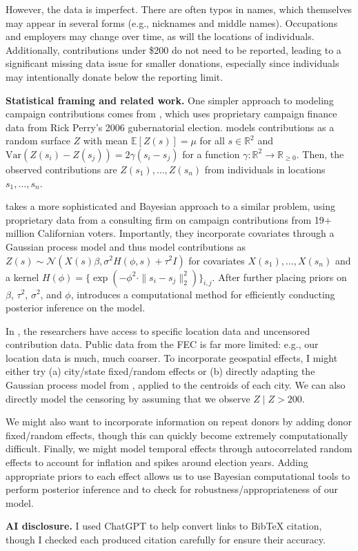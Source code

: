 \documentclass[11pt]{article}
\newcommand{\Nml}{\mathcal{N}}
\newcommand{\E}{\mathbb{E}}
\newcommand{\Var}{\mathrm{Var}}
\newcommand{\R}{\mathbb{R}}
\begin{document}
However, the data is imperfect. There are often typos in names, which themselves may appear in several forms (e.g., nicknames and middle names). Occupations and employers may change over time, as will the locations of individuals. Additionally, contributions under \$200 do not need to be reported, leading to a significant missing data issue for smaller donations, especially since individuals may intentionally donate below the reporting limit.

\textbf{Statistical framing and related work.} One simpler approach to modeling campaign contributions comes from \cite{cg2007_prospecting}, which uses proprietary campaign finance data from Rick Perry's 2006 gubernatorial election. \cite{cg2007_prospecting} models contributions as a random surface $Z$ with mean $\E[Z(s)] = \mu$ for all $s \in \R^2$ and $\Var(Z(s_i) - Z(s_j)) = 2 \gamma(s_i - s_j)$ for a function $\gamma : \R^2 \to \R_{\geq 0}$. Then, the observed contributions are $Z(s_1), \dots, Z(s_n)$ from individuals in locations $s_1, \dots, s_n$. 

\cite{bg2022_appliedgeospatial} takes a more sophisticated and Bayesian approach to a similar problem, using proprietary data from a consulting firm on campaign contributions from 19+ million Californian voters. Importantly, they incorporate covariates through a Gaussian process model and thus model contributions as $Z(s) \sim \Nml(X(s) \beta, \sigma^2 H(\phi, s) + \tau^2 I)$ for covariates $X(s_1), \dots, X(s_n)$ and a kernel $H(\phi) = \{\exp(-\phi^2 \cdot \|s_i - s_j\|_2^2)\}_{i,j}$. After further placing priors on $\beta$, $\tau^2$, $\sigma^2$, and $\phi$, \cite{bg2022_appliedgeospatial} introduces a computational method for efficiently conducting posterior inference on the model.

In \cite{cg2007_prospecting, bg2022_appliedgeospatial}, the researchers have access to specific location data and uncensored contribution data. Public data from the FEC is far more limited: e.g., our location data is much, much coarser. To incorporate geospatial effects, I might either try (a) city/state fixed/random effects or (b) directly adapting the Gaussian process model from \cite{bg2022_appliedgeospatial}, applied to the centroids of each city. We can also directly model the censoring by assuming that we observe $Z \mid Z > 200$. 

We might also want to incorporate information on repeat donors by adding donor fixed/random effects, though this can quickly become extremely computationally difficult. Finally, we  might model temporal effects through autocorrelated random effects to account for inflation and spikes around election years. Adding appropriate priors to each effect allows us to use Bayesian computational tools to perform posterior inference and to check for robustness/appropriateness of our model.


\newpage
\textbf{AI disclosure.} I used ChatGPT to help convert links to BibTeX citation, though I checked each produced citation carefully for ensure their accuracy.

 

\end{document}

